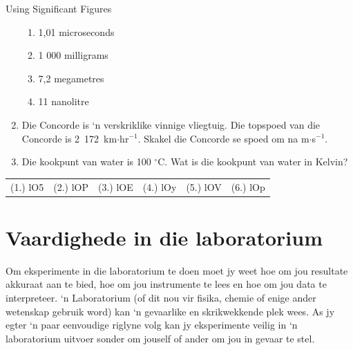 \begin{exercises}{Using Significant Figures }
\begin{enumerate}[noitemsep, label=\textbf{\arabic*}. ]
\begin{enumerate}[noitemsep, label=\textbf{\alph*}. ]
  \item 1,01 microseconds
  \item 1 000 milligrams
  \item 7,2 megametres
  \item 11 nanolitre
  \end{enumerate}
  \item Die Concorde is ‘n verskriklike vinnige vliegtuig. Die topspoed van die Concorde is 2~172~km$\ensuremath{\cdot}$hr${}^{-1}$. Skakel die Concorde se spoed om na m$\ensuremath{\cdot}$s${}^{-1}$.        
  \item Die kookpunt van water is 100 ${}^{\circ }$C. Wat is die kookpunt van water in Kelvin? 
\end{enumerate}
\par \practiceinfo
 \par \begin{tabular}[h]{cccccc}
  (1.) lO5  &  (2.) lOP  &  (3.) lOE  &  (4.) lOy  &  (5.) lOV  &  (6.) lOp \end{tabular}
\end{exercises}

\section{Vaardighede in die laboratorium}
Om eksperimente in die laboratorium te doen moet jy weet hoe om jou resultate akkuraat aan te bied, hoe om jou instrumente te lees en hoe om jou data te interpreteer. ‘n Laboratorium (of dit nou vir fisika, chemie of enige ander wetenskap gebruik word) kan ‘n gevaarlike en skrikwekkende plek wees. As jy egter ‘n paar eenvoudige riglyne volg kan jy eksperimente veilig in ‘n laboratorium uitvoer sonder om jouself of ander om jou in gevaar te stel.
